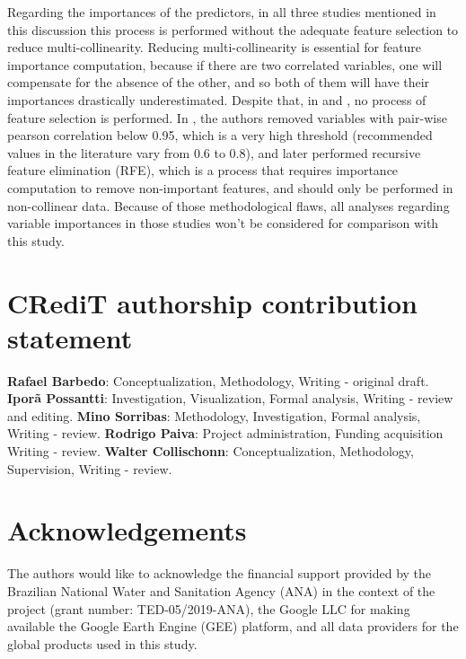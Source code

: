 \documentclass[12pt]{article}
\begin{document}
\par Regarding the importances of the predictors, in all three studies mentioned in this discussion this process is performed without the adequate feature selection to reduce multi-collinearity. Reducing multi-collinearity is essential for feature importance computation, because if there are two correlated variables, one will compensate for the absence of the other, and so both of them will have their importances drastically underestimated. Despite that, in \cite{worland2018} and \cite{potdar2021}, no process of feature selection is performed. In \cite{ferreira2021}, the authors removed variables with pair-wise pearson correlation below 0.95, which is a very high threshold (recommended values in the literature vary from 0.6 to 0.8), and later performed recursive feature elimination (RFE), which is a process that requires importance computation to remove non-important features, and should only be performed in non-collinear data. Because of those methodological flaws, all analyses regarding variable importances in those studies won’t be considered for comparison with this study.


\section*{CRediT authorship contribution statement}

\textbf{Rafael Barbedo}: Conceptualization, Methodology, Writing - original draft. \textbf{Iporã Possantti}: Investigation, Visualization, Formal analysis, Writing - review and editing. \textbf{Mino Sorribas}: Methodology, Investigation, Formal analysis, Writing - review. \textbf{Rodrigo Paiva}: Project administration, Funding acquisition Writing - review. \textbf{Walter Collischonn}: Conceptualization, Methodology, Supervision, Writing - review.

\section*{Acknowledgements}

\noindent \par The authors would like to acknowledge the financial support provided by the Brazilian National Water and Sanitation Agency (ANA) in the context of the project  (grant number: TED-05/2019-ANA), the Google LLC for making available the Google Earth Engine (GEE) platform, and all data providers for the global products used in this study.
\end{document}
